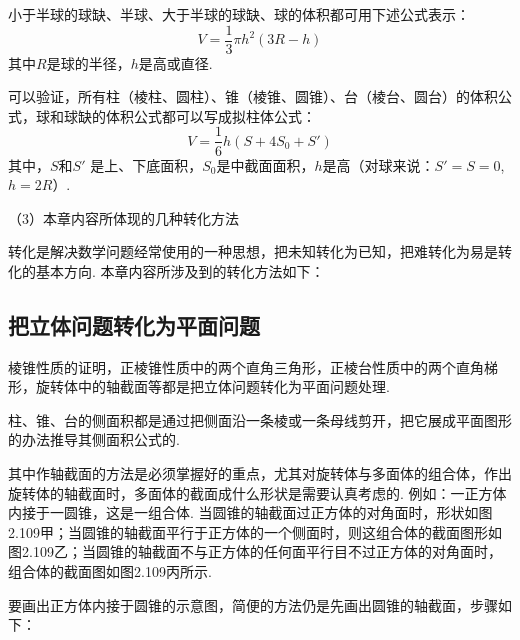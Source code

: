 小于半球的球缺、半球、大于半球的球缺、球的体积都可用下述公式表示：
\[
V=\frac{1}{3}\pi  h^{2}(3R-h)\]
其中$R$是球的半径，$h$是高或直径.

可以验证，所有柱（棱柱、圆柱）、锥（棱锥、圆锥）、台（棱台、圆台）的体积公式，球和球缺的体积公式都可以写成拟柱体公式：
\[
V=\frac{1}{6}h\left(S+4S_{0}+S' \right)
\]
其中，$S$和$S'$  是上、下底面积，$S_{0}$是中截面面积，$h$是高（对球来说：$S' =S=0$,  $h=2R$）.

（3）本章内容所体现的几种转化方法

转化是解决数学问题经常使用的一种思想，把未知转化为已知，把难转化为易是转化的基本方向. 本章内容所涉及到的转化方法如下：

\subsection*{把立体问题转化为平面问题}

棱锥性质的证明，正棱锥性质中的两个直角三角形，正棱台性质中的两个直角梯形，旋转体中的轴截面等都是把立体问题转化为平面问题处理.

柱、锥、台的侧面积都是通过把侧面沿一条棱或一条母线剪开，把它展成平面图形的办法推导其侧面积公式的.

其中作轴截面的方法是必须掌握好的重点，尤其对旋转体与多面体的组合体，作出旋转体的轴截面时，多面体的截面成什么形状是需要认真考虑的. 例如：一正方体内接于一圆锥，这是一组合体. 当圆锥的轴截面过正方体的对角面时，形状如图2.109甲；当圆锥的轴截面平行于正方体的一个侧面时，则这组合体的截面图形如图2.109乙；当圆锥的轴截面不与正方体的任何面平行目不过正方体的对角面时，组合体的截面图如图2.109丙所示.

要画出正方体内接于圆锥的示意图，简便的方法仍是先画出圆锥的轴截面，步骤如下：
\begin{figure}[htp]
    \centering
{}
    \caption{}
\end{figure}

